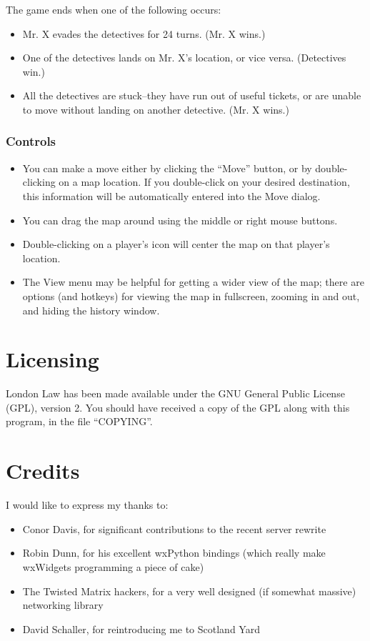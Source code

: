\documentclass[11pt,notitlepage]{article}
\begin{document}
The game ends when one of the following occurs:
\begin{itemize}
   \item Mr. X evades the detectives for 24 turns.  (Mr. X wins.)
   \item One of the detectives lands on Mr. X's location, or vice versa.  (Detectives win.)
   \item All the detectives are stuck--they have run out of useful tickets, or are
      unable to move without landing on another detective.  (Mr. X wins.)
\end{itemize}

\subsubsection*{Controls}
\begin{itemize}
   \item You can make a move either by clicking the ``Move'' button, or by
      double-clicking on a map location.  If you double-click on your desired
      destination, this information will be automatically entered into the Move
      dialog.
   \item You can drag the map around using the middle or right mouse buttons.
   \item Double-clicking on a player's icon will center the map on that player's
      location.
   \item The View menu may be helpful for getting a wider view of the map; there are
      options (and hotkeys) for viewing the map in fullscreen, zooming in and
      out, and hiding the history window.
\end{itemize}


\section*{Licensing}
London Law has been made available under the GNU General Public License (GPL), 
version 2.  You should have received a copy of the GPL along with this 
program, in the file ``COPYING''.


\section*{Credits}
I would like to express my thanks to:
\begin{itemize}
   \item Conor Davis, for significant contributions to the recent server rewrite
   \item Robin Dunn, for his excellent wxPython bindings (which really make wxWidgets
      programming a piece of cake)
   \item The Twisted Matrix hackers, for a very well designed (if somewhat massive)
      networking library
   \item David Schaller, for reintroducing me to Scotland Yard
\end{itemize}
\end{document}

